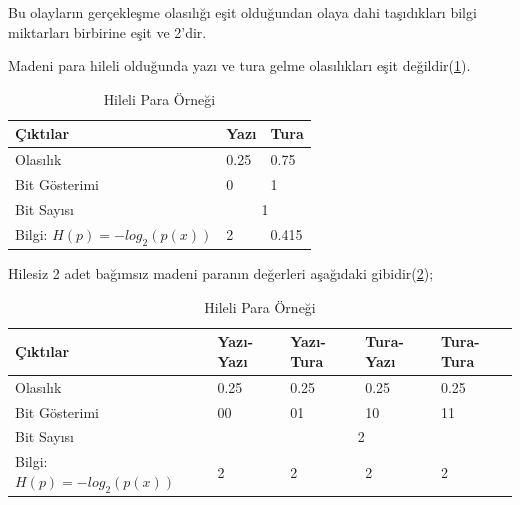 \documentclass[12pt, a4paper]{article}
\begin{document}
			Bu olayların gerçekleşme olasılığı eşit olduğundan olaya dahi taşıdıkları bilgi miktarları birbirine eşit ve 2'dir.
			
			Madeni para hileli olduğunda yazı ve tura gelme olasılıkları eşit değildir(\ref{tab:Tablo2}). 
			\begin{table}[htbp]
				\begin {center}
				\caption{Hileli Para Örneği \cite{entropi}}	\label{tab:Tablo2}
				\begin{tabular}{|l|l|l|}
					\hline
					Çıktılar & Yazı & Tura \\
					\hline
					Olasılık & 0.25 & 0.75 \\
					\hline
					Bit Gösterimi & 0 & 1 \\
					\hline
					Bit Sayısı & \multicolumn{2}{|c|}{1} \\
					\hline
					Bilgi: $H(p)= -log_2(p(x))$	& 2 & 0.415 \\
					\hline
				\end{tabular}
				\end {center}
			\end{table}
		
			Hilesiz 2 adet bağımsız madeni paranın değerleri aşağıdaki gibidir(\ref{tab:Tablo3});
			\begin{table}[htbp]
				\begin {center}
				\caption{Hileli Para Örneği \cite{entropi}}	\label{tab:Tablo3}
				\begin{tabular}{|l|l|l|l|l|}
					\hline
					Çıktılar & Yazı-Yazı & Yazı-Tura & Tura-Yazı & Tura-Tura \\
					\hline
					Olasılık & 0.25 & 0.25 & 0.25 & 0.25\\
					\hline
					Bit Gösterimi & 00 & 01 & 10 & 11 \\
					\hline
					Bit Sayısı & \multicolumn{4}{|c|}{2} \\
					\hline
					Bilgi: $H(p)= -log_2(p(x))$	& 2	& 2 & 2	& 2 \\
					\hline
				\end{tabular}
				\end {center}
			\end {table}
		
\end{document}
